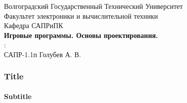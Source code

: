 \begin{frame}
    \begin{center}
        \small
        Волгоградский Государственный Технический Университет \\
        Факультет электроники и вычислительной техники \\
        Кафедра САПРиПК \\
        \vspace{2.0cm}
        \normalsize
        \textbf{Игровые программы. Основы проектирования.} \\
        \vspace{1.5cm}
        \raggedleft{}:\\САПР-1.1п Голубев А. В.\\
        \vspace{1.5cm}
        \vspace{\fill}
         \the\year
    \end{center}
\end{frame}

\begin{frame}
    \frametitle{Title}
    \framesubtitle{Subtitle}
\end{frame}